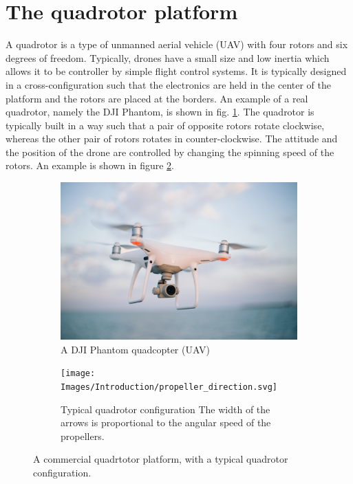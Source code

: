 \documentclass{thesisreport}
\begin{document}
 
 
 \section*{The quadrotor platform}

A quadrotor is a type of unmanned aerial vehicle (UAV) with four rotors and six degrees of freedom. Typically, drones have a small size and low inertia which allows it to be controller by simple flight control systems. It is typically designed in a cross-configuration such that the electronics are held in the center of the platform and the rotors are placed at the borders.
An example of a real quadrotor, namely the DJI Phantom, is shown in fig. \ref{fig:drone}. The quadrotor is typically built in a way such that a pair of opposite rotors rotate clockwise, whereas the other pair of rotors rotates in counter-clockwise.
The attitude and the position of the drone are controlled by changing the spinning speed of the rotors. An example is shown in figure \ref{fig:propeller_directions}.



\begin{figure}[h]
     \centering
     \begin{subfigure}[b]{0.45\textwidth}
         \centering
         \includegraphics[width=\textwidth]{Images/Introduction/drone}
         \caption[Caption for LOF]{A DJI Phantom quadcopter (UAV)\protect\footnotemark}
         \label{fig:drone}
     \end{subfigure}
     \hfill
     \begin{subfigure}[b]{0.45\textwidth}
         \centering
         \texttt{[image: Images/Introduction/propeller\_direction.svg]}
         \caption{Typical quadrotor configuration The width of the arrows is proportional to the angular speed of the propellers.\cite{Bouabdalla2007}}
         \label{fig:propeller_directions}
     \end{subfigure}
        \caption{A commercial quadrtotor platform, with a typical quadrotor configuration.}
        \label{fig:three graphs}
\end{figure}
\end{document}
